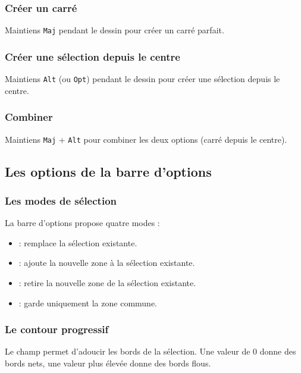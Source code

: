 \subsubsection{Créer un carré}

Maintiens \texttt{Maj} pendant le dessin pour créer un carré parfait.

\subsubsection{Créer une sélection depuis le centre}

Maintiens \texttt{Alt} (ou \texttt{Opt}) pendant le dessin pour créer une sélection depuis le centre.

\subsubsection{Combiner}

Maintiens \texttt{Maj} + \texttt{Alt} pour combiner les deux options (carré depuis le centre).

\subsection{Les options de la barre d'options}

\subsubsection{Les modes de sélection}

La barre d'options propose quatre modes :

\begin{itemize}
    \item {} : remplace la sélection existante.
    \item {} : ajoute la nouvelle zone à la sélection existante.
    \item {} : retire la nouvelle zone de la sélection existante.
    \item {} : garde uniquement la zone commune.
\end{itemize}

\subsubsection{Le contour progressif}

Le champ  permet d'adoucir les bords de la sélection. Une valeur de 0 donne des bords nets, une valeur plus élevée donne des bords flous.

